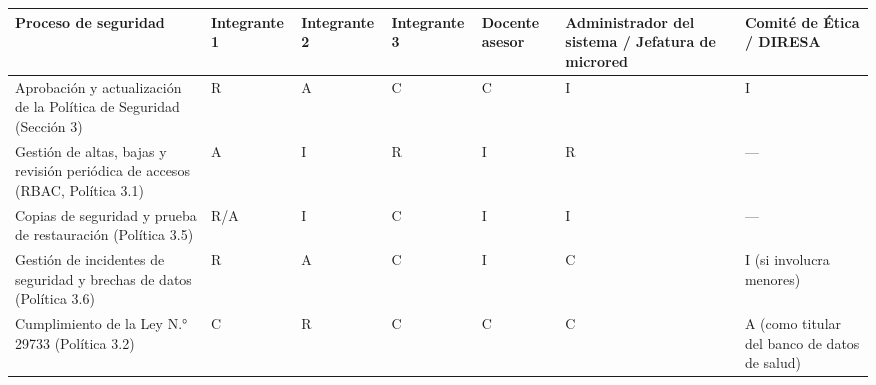 \documentclass[11pt,a4paper]{article}
\begin{document}
{\small
\begin{longtable}[]{@{}
  >{\raggedright\arraybackslash}p{}
  >{\raggedright\arraybackslash}p{}
  >{\raggedright\arraybackslash}p{}
  >{\raggedright\arraybackslash}p{}
  >{\raggedright\arraybackslash}p{}
  >{\raggedright\arraybackslash}p{}
  >{\raggedright\arraybackslash}p{}@{}}
\toprule\noalign{}
\begin{minipage}[b]{\linewidth}\raggedright
Proceso de seguridad
\end{minipage} & \begin{minipage}[b]{\linewidth}\raggedright
Integrante 1
\end{minipage} & \begin{minipage}[b]{\linewidth}\raggedright
Integrante 2
\end{minipage} & \begin{minipage}[b]{\linewidth}\raggedright
Integrante 3
\end{minipage} & \begin{minipage}[b]{\linewidth}\raggedright
Docente asesor
\end{minipage} & \begin{minipage}[b]{\linewidth}\raggedright
Administrador del sistema / Jefatura de microred
\end{minipage} & \begin{minipage}[b]{\linewidth}\raggedright
Comité de Ética / DIRESA
\end{minipage} \\
\midrule\noalign{}
\endhead
\bottomrule\noalign{}
\endlastfoot
Aprobación y actualización de la Política de Seguridad (Sección 3) & R & A & C & C & I & I \\
Gestión de altas, bajas y revisión periódica de accesos (RBAC, Política 3.1) & A & I & R & I & R & --- \\
Copias de seguridad y prueba de restauración (Política 3.5) & R/A & I & C & I & I & --- \\
Gestión de incidentes de seguridad y brechas de datos (Política 3.6) & R & A & C & I & C & I (si involucra menores) \\
Cumplimiento de la Ley N.° 29733 (Política 3.2) & C & R & C & C & C & A (como titular del banco de datos de salud) \\

\end{longtable}}
\end{document}
